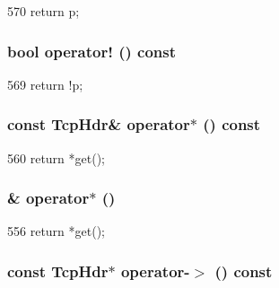 \begin{DoxyCode}
570 { return p; }
\end{DoxyCode}
\hypertarget{classNet_1_1TcpPtr_ac8b1d32dbd52d431450c70b151cfa205}{
\subsubsection[{operator!}]{\setlength{\rightskip}{0pt plus 5cm}bool operator! () const}}
\label{classNet_1_1TcpPtr_ac8b1d32dbd52d431450c70b151cfa205}



\begin{DoxyCode}
569 { return !p; }
\end{DoxyCode}
\hypertarget{classNet_1_1TcpPtr_a2ca7a4d104b858c85e87c0ae34a2c1a4}{
\subsubsection[{operator$\ast$}]{\setlength{\rightskip}{0pt plus 5cm}const {\bf TcpHdr}\& operator$\ast$ () const}}
\label{classNet_1_1TcpPtr_a2ca7a4d104b858c85e87c0ae34a2c1a4}



\begin{DoxyCode}
560 { return *get(); }
\end{DoxyCode}
\hypertarget{classNet_1_1TcpPtr_a8a7f53969ce71388158c3e38493ba9f3}{
\subsubsection[{operator$\ast$}]{\& operator$\ast$ ()}}
\label{classNet_1_1TcpPtr_a8a7f53969ce71388158c3e38493ba9f3}



\begin{DoxyCode}
556 { return *get(); }
\end{DoxyCode}
\hypertarget{classNet_1_1TcpPtr_a5a8969d9dfbdfb9e8c0566fb2300e05d}{
\subsubsection[{operator-\/$>$}]{\setlength{\rightskip}{0pt plus 5cm}const {\bf TcpHdr}$\ast$ operator-\/$>$ () const}}
\label{classNet_1_1TcpPtr_a5a8969d9dfbdfb9e8c0566fb2300e05d}



